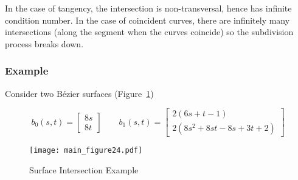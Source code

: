 \documentclass[letterpaper,10pt]{article}
\theoremstyle{definition}
\begin{document}
In the case of tangency, the intersection is non-transversal, hence has
infinite condition number. In the case of coincident curves, there are
infinitely many intersections (along the segment when the curves
coincide) so the subdivision process breaks down.

\subsubsection{Example}

Consider two B\'{e}zier surfaces
(Figure~\ref{fig:surface-surface-example})

\begin{equation}
b_0(s, t) =
\left[ \begin{array}{c}
    8 s \\ 8 t \end{array}\right] \qquad
b_1(s, t) =
\left[ \begin{array}{c}
    2 (6 s + t - 1) \\
    2 (8 s^2 + 8 s t - 8 s + 3 t + 2) \end{array}\right]
\end{equation}
\begin{figure}
  \texttt{[image: main\_figure24.pdf]}
  \centering
  \captionsetup{width=.75\linewidth}
  \caption{Surface Intersection Example}
  \label{fig:surface-surface-example}
\end{figure}
\end{document}

